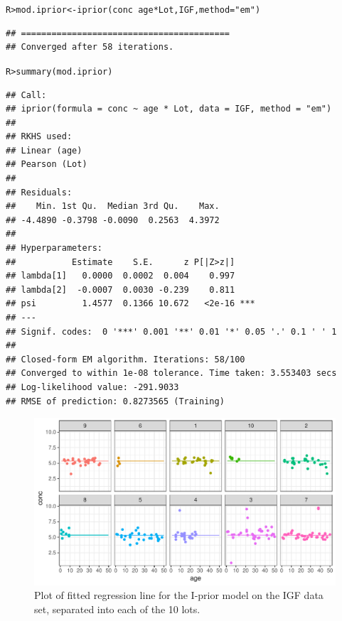 \documentclass[showframe,11pt,twoside,openright]{report}\usepackage[]{graphicx}\usepackage{xcolor}
\makeatletter
\def\maxwidth{ %
  \ifdim\Gin@nat@width>\linewidth
    \linewidth
  \else
    \Gin@nat@width
  \fi
}
\newcommand{\hlstr}[1]{\textcolor[rgb]{0.063,0.58,0.627}{#1}}%
\newcommand{\hlopt}[1]{\textcolor[rgb]{0.196,0.196,0.196}{#1}}%
\newcommand{\hlstd}[1]{\textcolor[rgb]{0.196,0.196,0.196}{#1}}%
\newcommand{\hlkwb}[1]{\textcolor[rgb]{0.627,0,0.314}{#1}}%
\newcommand{\hlkwc}[1]{\textcolor[rgb]{0,0.631,0.314}{#1}}%
\newcommand{\hlkwd}[1]{\textcolor[rgb]{0.78,0.227,0.412}{#1}}%
\newenvironment{kframe}{%
 \def\at@end@of@kframe{}%
 \ifinner\ifhmode%
  \def\at@end@of@kframe{\end{minipage}}%
  \begin{minipage}{\columnwidth}%
 \fi\fi%
 \def\FrameCommand##1{\hskip\@totalleftmargin \hskip-\fboxsep
 \colorbox{shadecolor}{##1}\hskip-\fboxsep
     \hskip-\linewidth \hskip-\@totalleftmargin \hskip\columnwidth}%
 \MakeFramed {\advance\hsize-\width
   \@totalleftmargin\z@ \linewidth\hsize
   \@setminipage}}%
 {\par\unskip\endMakeFramed%
 \at@end@of@kframe}
\newenvironment{knitrout}{}{} %
\makeatother
\begin{document}
\begin{knitrout}
\color{fgcolor}\begin{kframe}
\singlespacing\begin{alltt}
\hlstd{R> }\hlstd{mod.iprior} \hlkwb{<-} \hlkwd{iprior}\hlstd{(conc} \hlopt{~} \hlstd{age} \hlopt{*} \hlstd{Lot, IGF,} \hlkwc{method} \hlstd{=} \hlstr{"em"}\hlstd{)}
\end{alltt}
\begin{verbatim}
## =========================================
## Converged after 58 iterations.
\end{verbatim}
\begin{alltt}
\hlstd{R> }\hlkwd{summary}\hlstd{(mod.iprior)}
\end{alltt}
\begin{verbatim}
## Call:
## iprior(formula = conc ~ age * Lot, data = IGF, method = "em")
## 
## RKHS used:
## Linear (age)
## Pearson (Lot)
## 
## Residuals:
##    Min. 1st Qu.  Median 3rd Qu.    Max. 
## -4.4890 -0.3798 -0.0090  0.2563  4.3972 
## 
## Hyperparameters:
##           Estimate    S.E.      z P[|Z>z|]    
## lambda[1]   0.0000  0.0002  0.004    0.997    
## lambda[2]  -0.0007  0.0030 -0.239    0.811    
## psi         1.4577  0.1366 10.672   <2e-16 ***
## ---
## Signif. codes:  0 '***' 0.001 '**' 0.01 '*' 0.05 '.' 0.1 ' ' 1
## 
## Closed-form EM algorithm. Iterations: 58/100 
## Converged to within 1e-08 tolerance. Time taken: 3.553403 secs
## Log-likelihood value: -291.9033 
## RMSE of prediction: 0.8273565 (Training)
\end{verbatim}
\end{kframe}
\end{knitrout}
\begin{knitrout}
\color{fgcolor}\begin{kframe}
\singlespacing\end{kframe}\begin{figure}

{\centering \includegraphics[width=\maxwidth]{figure/04-IGF_mod_iprior_plot-1} 

}

\caption[Plot of fitted regression line for the I-prior model on the IGF data set]{Plot of fitted regression line for the I-prior model on the IGF data set, separated into each of the 10 lots.}\label{fig:IGF.mod.iprior.plot}
\end{figure}


\end{knitrout}
\end{document}
